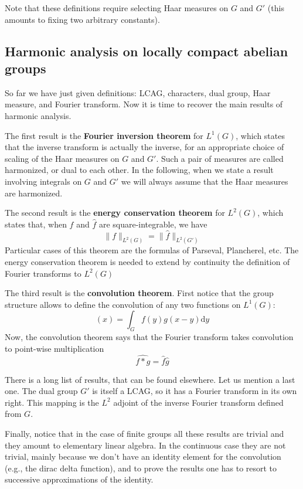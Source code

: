 Note that these definitions require selecting Haar measures on $G$
and $G'$ (this amounts to fixing two arbitrary constants).

\subsection{Harmonic analysis on locally compact abelian groups}

So far we have just given definitions: LCAG, characters, dual group, Haar
measure, and Fourier transform.  Now it is time to recover the main results
of harmonic analysis.

The first result is the {\bf Fourier inversion theorem} for $L^1(G)$, which
states that the inverse transform is actually the inverse, for an appropriate
choice of scaling of the Haar measures on $G$ and $G'$.  Such a pair of
measures are called harmonized, or dual to each other.  In the following,
when we state a result involving integrals on $G$ and $G'$ we will always
assume that the Haar measures are harmonized.

The second result is the {\bf energy conservation theorem} for $L^2(G)$,
which states that, when $f$ and $\hat f$ are square-integrable, we have
\begin{equation}
\|f\|_{L^2(G)}
=
\|\hat f\|_{L^2(G')}
\end{equation}
Particular cases of this theorem are the formulas of Parseval, Plancherel,
etc.
The energy conservation theorem is needed to extend by continuity the
definition of Fourier transforms to $L^2(G)$

The third result is the {\bf convolution theorem}.  First notice that the
group structure allows to define the convolution of any two functions on
$L^1(G)$:
\begin{equation}
[f*g](x) = \int_G f(y)g(x-y)\mathrm{d} y
\end{equation}
Now, the convolution theorem says that the Fourier transform takes
convolution to point-wise multiplication
\begin{equation}
\widehat{f*g} = \hat f \hat g
\end{equation}

There is a long list of results, that can be found elsewhere.  Let us mention
a last one.  The dual group $G'$ is itself a LCAG, so it has a Fourier
transform in its own right.  This mapping is the $L^2$ adjoint of the inverse
Fourier transform defined from $G$.

Finally, notice that in the case of finite groups all these results are
trivial and they amount to elementary linear algebra.  In the continuous case
they are not trivial, mainly because we don't have an identity element for
the convolution (e.g., the dirac delta function), and to prove the results
one has to resort to successive approximations of the identity.

